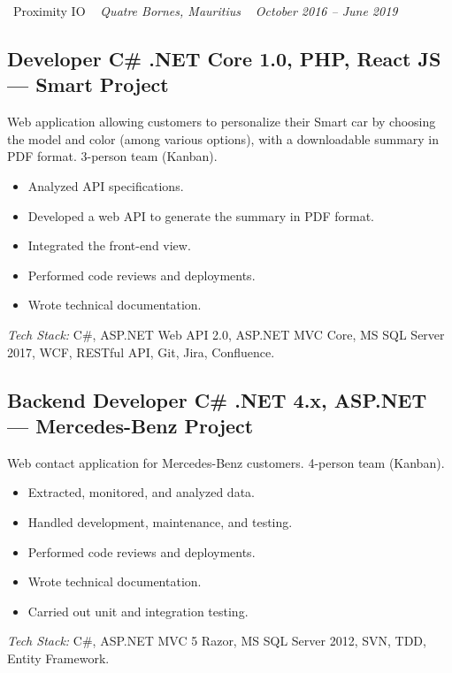 \documentclass[10pt,a4paper]{article}
\begin{document}
\vspace{10pt}

\noindent\textcolor{primary}{ \faBuilding\ Proximity IO} \quad
\textit{ \small \textcolor{darkgray}{ \faMapMarker\ } Quatre Bornes, Mauritius } \hfill
\textit{ \small \textcolor{darkgray}{ \faCalendar\ } October 2016 -- June 2019 }

\vspace{4pt}

\subsection*{Developer C\# .NET Core 1.0, PHP, React JS --- Smart Project}
\color{darkgray}
Web application allowing customers to personalize their Smart car by choosing the model and color (among various options), with a downloadable summary in PDF format. 3-person team (Kanban).
\begin{itemize}
  \item Analyzed API specifications.
  \item Developed a web API to generate the summary in PDF format.
  \item Integrated the front-end view.
  \item Performed code reviews and deployments.
  \item Wrote technical documentation.
\end{itemize}
\textit{Tech Stack:} C\#, ASP.NET Web API 2.0, ASP.NET MVC Core, MS SQL Server 2017, WCF, RESTful API, Git, Jira, Confluence.

\vspace{6pt}

\subsection*{Backend Developer C\# .NET 4.x, ASP.NET --- Mercedes-Benz Project}
\color{darkgray}
Web contact application for Mercedes-Benz customers. 4-person team (Kanban).
\begin{itemize}
  \item Extracted, monitored, and analyzed data.
  \item Handled development, maintenance, and testing.
  \item Performed code reviews and deployments.
  \item Wrote technical documentation.
  \item Carried out unit and integration testing.
\end{itemize}
\textit{Tech Stack:} C\#, ASP.NET MVC 5 Razor, MS SQL Server 2012, SVN, TDD, Entity Framework.
\end{document}
